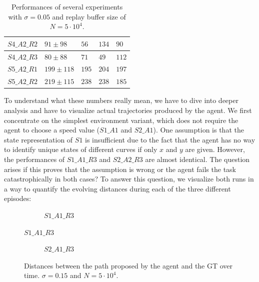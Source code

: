 \begin{table}[H]
\begin{tabular}{|l|l|l|l|l|}
{\color[HTML]{333333} $S4\_A2\_R2$}       & {\color[HTML]{333333} $91 \pm 98$}                & {\color[HTML]{333333} $56$}            & {\color[HTML]{333333} $134$}           & {\color[HTML]{333333} $90$}            \\ \hline
$S4\_A2\_R3$                              & $80 \pm 88$                                     & $71$                                  & $49$                                  & $112$                                  \\ \hline
$S5\_A2\_R1$                              & $199 \pm 118$                                     & $195$                                  & $204$                                  & $197$                                  \\ \hline
$S5\_A2\_R2$                              & $219 \pm 115$                                     & $238$                                  & $238$                                  & $185$                                  \\ \hline
\end{tabular}
\caption{ Performances of several experiments with $\sigma = 0.05$ and replay buffer size of $N=5 \cdot 10^4$.}
\label{tab:resultsK3}
\end{table}

To understand what these numbers really mean, we have to dive into deeper analysis and have to visualize actual trajectories produced by the agent. We first concentrate on the simplest environment variant, which does not require the agent to choose a speed value ($S1\_A1$ and $S2\_A1$). One assumption is that the state representation of $S1$ is insufficient due to the fact that the agent has no way to identify unique states of different curves if only $x$ and $y$ are given. However, the performances of $S1\_A1\_R3$ and $S2\_A2\_R3$ are almost identical. The question arises if this proves that the assumption is wrong or the agent fails the task catastrophically in both cases? To answer this question, we visualize both runs in a way to quantify the evolving distances during each of the three different episodes:
\par

\begin{figure}[H]
     \centering
     \begin{subfigure}[b]{0.9\textwidth}
         \centering
         
         \caption{$S1\_A1\_R3$}
     \end{subfigure}
\end{figure}
\begin{figure}\ContinuedFloat
     \begin{subfigure}[b]{0.9\textwidth}
         \centering
         
         \caption{$S2\_A1\_R3$}
     \end{subfigure}
        \caption{Distances between the path proposed by the agent and the GT over time. $\sigma = 0.15$ and $N=5\cdot 10^4$.}
        \label{fig:simpleCurves1}
\end{figure}

